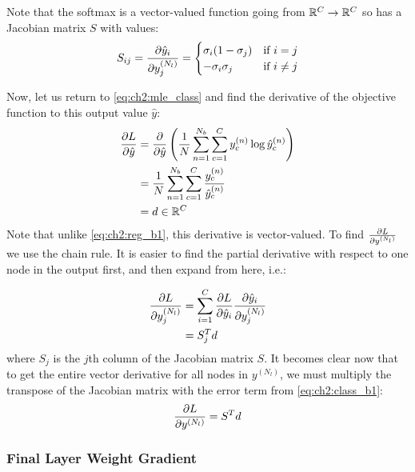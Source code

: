 Note that the softmax is a vector-valued function going from $\reals[C] \rightarrow
\reals[C]$ so has a Jacobian matrix $S$ with values:
\begin{equation}
  S_{ij} = \dydx{\hat{y}_i}{y^{(N_l)}_j} = \begin{cases}
    \sigma_i (1-\sigma_j) & \text{if $i=j$}\\
    -\sigma_i \sigma_j & \text{if $i\neq j$}\\
  \end{cases}
\end{equation}

Now, let us return to \eqref{eq:ch2:mle_class} and find the derivative of the
objective function to this output value $\hat{y}$:
\begin{align}
  \dydx{L}{\hat{y}} &=  \dydx{}{\hat{y}} \left( \frac{1}{N}\sum_{n=1}^{N_b} \sum_{c=1}^C
  y^{(n)}_c \log \hat{y}^{(n)}_c \right) \\
  &= \frac{1}{N}\sum_{n=1}^{N_b} \sum_{c=1}^C \frac{y^{(n)}_c}{\hat{y}^{(n)}_c} \\
  &= d \in \reals[C] \label{eq:ch2:class_b1}
\end{align}
Note that unlike \eqref{eq:ch2:reg_b1}, this derivative is vector-valued. To
find $\dydx{L}{y^{(N_l)}}$ we use the chain rule. It is easier to find the
partial derivative with respect to one node in the output first, and then expand
from here, i.e.:

\begin{align}
  \dydx{L}{y^{(N_l)}_j} &= \sum_{i=1}^C \dydx{L}{\hat{y}_i}\dydx{\hat{y}_i}{y^{(N_l)}_j} \\
                      &= S_j^T d
\end{align}
where $S_j$ is the $j$th column of the Jacobian matrix $S$. It becomes clear now
that to get the entire vector derivative for all nodes in $y^{(N_l)}$, we must
multiply the transpose of the Jacobian matrix with the error term from
\eqref{eq:ch2:class_b1}:
\begin{equation}
  \dydx{L}{y^{(N_l)}} = S^T d
\end{equation}

\subsubsection{Final Layer Weight Gradient} \label{sec:ch2:weight}

